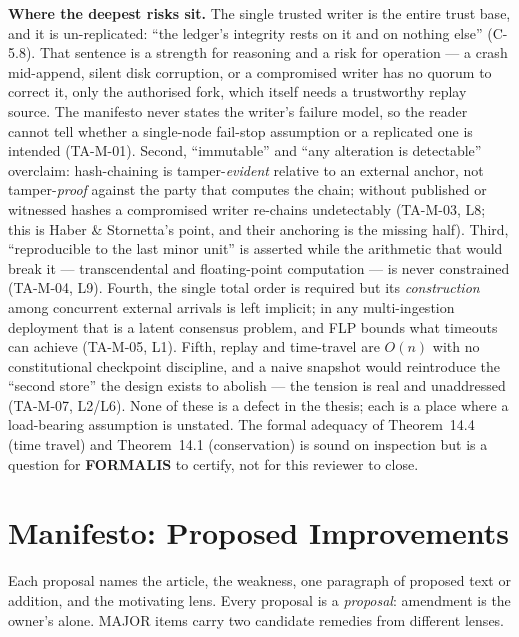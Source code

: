 \documentclass[11pt,a4paper]{article}
\begin{document}
\textbf{Where the deepest risks sit.} The single trusted writer is the entire trust base, and
it is un-replicated: ``the ledger's integrity rests on it and on nothing else'' (C-5.8). That
sentence is a strength for reasoning and a risk for operation --- a crash mid-append, silent
disk corruption, or a compromised writer has no quorum to correct it, only the authorised fork,
which itself needs a trustworthy replay source. The manifesto never states the writer's failure
model, so the reader cannot tell whether a single-node fail-stop assumption or a replicated one
is intended (TA-M-01). Second, ``immutable'' and ``any alteration is detectable'' overclaim:
hash-chaining is tamper-\emph{evident} relative to an external anchor, not tamper-\emph{proof}
against the party that computes the chain; without published or witnessed hashes a compromised
writer re-chains undetectably (TA-M-03, L8; this is Haber \& Stornetta's point, and their
anchoring is the missing half). Third, ``reproducible to the last minor unit'' is asserted while
the arithmetic that would break it --- transcendental and floating-point computation --- is
never constrained (TA-M-04, L9). Fourth, the single total order is required but its
\emph{construction} among concurrent external arrivals is left implicit; in any multi-ingestion
deployment that is a latent consensus problem, and FLP bounds what timeouts can achieve
(TA-M-05, L1). Fifth, replay and time-travel are $O(n)$ with no constitutional checkpoint
discipline, and a naive snapshot would reintroduce the ``second store'' the design exists to
abolish --- the tension is real and unaddressed (TA-M-07, L2/L6). None of these is a defect in
the thesis; each is a place where a load-bearing assumption is unstated. The formal adequacy of
Theorem~14.4 (time travel) and Theorem~14.1 (conservation) is sound on inspection but is a
question for \textbf{FORMALIS} to certify, not for this reviewer to close.

\section{Manifesto: Proposed Improvements}

Each proposal names the article, the weakness, one paragraph of proposed text or addition, and
the motivating lens. Every proposal is a \emph{proposal}: amendment is the owner's alone. MAJOR
items carry two candidate remedies from different lenses.
\end{document}
